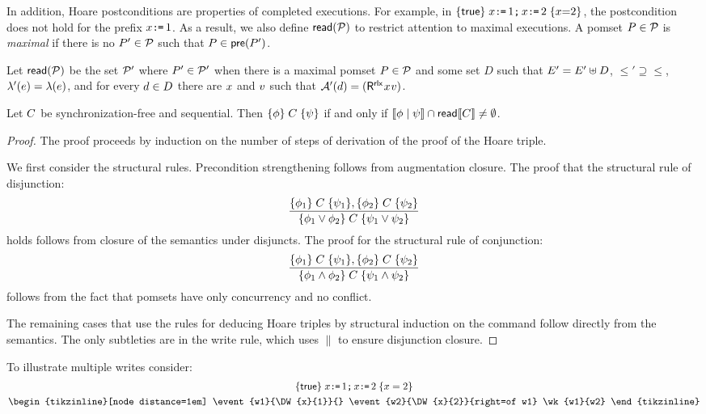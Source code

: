 In addition, Hoare postconditions are properties of completed executions.
For example, in $\{\mathsf{true}\}\allowbreak\;x\texttt{:}\mkern-1mu\texttt{=}\,1\texttt{;}\,\allowbreak x\texttt{:}\mkern-1mu\texttt{=}\,2\;\allowbreak\{x{=}2\}$, the postcondition
does not hold for the prefix $x\texttt{:}\mkern-1mu\texttt{=}\,1$.  As a result, we also define
${\mathsf{read}}(\mathcal{P})$ to restrict attention to maximal executions.  A pomset
$P\in\mathcal{P}$ is \emph{maximal} if there is no $P'\in\mathcal{P}$ such that
$P\in\mathsf{pre}(P')$.


Let ${\mathsf{read}}(\mathcal{P})$ be the set $\mathcal{P}'$ where $P'\in\mathcal{P}'$ when there is
a maximal pomset $P\in\mathcal{P}$ and some set $D$ such that
$E'= E'\uplus D$, ${\le'} \supseteq{\le}$,
$\lambda'(e) = \lambda(e)$, and for every $d\in D$ there are
$x$ and $v$ such that
$\labelingAct'(\bEv)=(\DR[\modeRLX]{\aLoc}{\aVal})$.

\begin{theorem}
  \label{thm:hoare}
  Let $C$ be synchronization-free and sequential.  Then
  $\{\phi\}\allowbreak\;C\;\allowbreak\{\psi\}$ if and only if
  $\llbracket\phi\mid\psi\rrbracket\cap\mathsf{read}\llbracket C\rrbracket\neq\emptyset$.
\begin{proof}
  The proof proceeds by induction on the number of steps of derivation of the
  proof of the Hoare triple.

  We first consider the structural rules.  Precondition strengthening follows
  from augmentation closure.  The proof that the structural rule of
  disjunction:
  \begin{displaymath}
    \frac{\{\phi_1\}\allowbreak\;C\;\allowbreak\{\psi_1\},  \{\phi_2\}\allowbreak\;C\;\allowbreak\{\psi_2\}}{ \{\phi_1 \lor \phi_2\}\allowbreak\;C\;\allowbreak\{\psi_1\lor \psi_2\}} 
  \end{displaymath}
  holds  follows from closure of the semantics under disjuncts. The proof for the structural rule of conjunction:
  \begin{displaymath}
    \frac{\{\phi_1\}\allowbreak\;C\;\allowbreak\{\psi_1\},  \{\phi_2\}\allowbreak\;C\;\allowbreak\{\psi_2\}}{ \{\phi_1 \land \phi_2\}\allowbreak\;C\;\allowbreak\{\psi_1\land \psi_2\}} 
  \end{displaymath}
  follows from the fact that pomsets have only concurrency and no conflict.  

  The remaining cases that use the rules for deducing Hoare triples by
  structural induction on the command follow directly from the semantics.
  The only subtleties are in the write rule, which uses $\parallel$ to ensure
  disjunction closure.
\end{proof}
\end{theorem}
To illustrate multiple writes consider:
\begin{gather*}
  \hoare{\TRUE}{x\GETS 1 \SEMI x \GETS 2}{x=2}
  \\
  \hbox{\begin{tikzinline}[node distance=1em]
      \event{w1}{\DW{x}{1}}{}
      \event{w2}{\DW{x}{2}}{right=of w1}
      \wk{w1}{w2}
    \end{tikzinline}}
\end{gather*}
